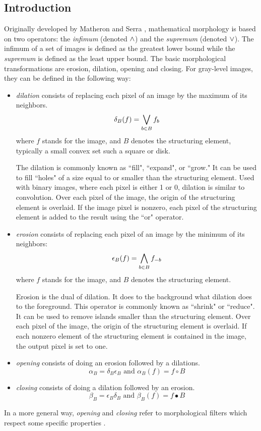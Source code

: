 \subsection{Introduction}
Originally developed by Matheron \cite{ima:matheron67,ima:matheron75}
and Serra \cite{ima:serra82}, mathematical morphology is based 
on two operators: the {\em infimum} (denoted $\wedge$) 
and the {\em supremum}  (denoted $\vee$). 
The infimum of a set of images is defined
as the greatest lower bound while the {\em supremum} is defined as 
the least upper bound. The basic morphological transformations 
are erosion, dilation, opening and closing. For gray-level images, 
they can be defined in the following way:
\begin{itemize}

\item {\it dilation} consists of  
replacing each pixel of an image by the maximum of its neighbors.
\[
\delta_B(f) = \bigvee_{b \in B} f_b
\]
where $f$ stands for the image, and $B$ denotes the
structuring element, typically a small convex set such a square or disk.

The dilation is commonly known
as ``fill", ``expand", or ``grow." It can be used to fill ``holes" of a 
size equal to or smaller than the structuring element.
Used with binary images, where each pixel is either 1 or 0, dilation is
similar to convolution. Over each pixel of the image, the origin of 
the structuring element is overlaid. If the image pixel is nonzero,
 each pixel of the structuring element is added to the result using 
 the ``or" operator.

\item {\it erosion} consists of 
replacing each pixel of an image by the minimum of
its neighbors:
\[
\epsilon_B(f) = \bigwedge_{b \in B} f_{-b}
\]
where $f$ stands for the image, and $B$ denotes the structuring element.

Erosion is the dual of dilation. It does to the background what dilation 
does to the foreground. This operator is commonly known as ``shrink" 
or ``reduce".
 It can be used to remove islands smaller than the structuring element. 
Over each pixel of the image, the origin of the structuring 
element is overlaid. If each nonzero element of the 
structuring element is contained in the image, the output pixel is set to one. 

\item {\it opening} consists of doing an erosion followed by a dilations.
\[
\alpha_B = \delta_B \epsilon_B \mbox{ and }  \alpha_B(f) = f \circ B
\]
\item {\it closing} consists of doing a dilation followed by an erosion.
\[
\beta_B = \epsilon_B \delta_B  \mbox{ and }  \beta_B(f) = f  \bullet B
\]
\end{itemize}
In a more general way, {\em opening} and {\em closing} refer to morphological
filters which respect some specific properties \cite{ima:breen00}.

